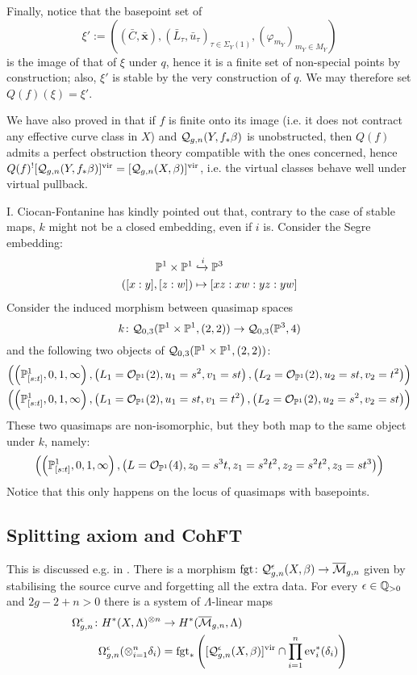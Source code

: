 Finally, notice that the basepoint set of \[\xi':=\left((\bar C,\bar{\mathbf x}),(\bar L_\tau,\bar u_\tau)_{\tau\in\Sigma_Y(1)},(\varphi_{m_Y})_{m_Y\in M_Y}\right)\] is the image of that of $\xi$ under $q$, hence it is a finite set of non-special points by construction; also, $\xi'$ is stable by the very construction of $q$. We may therefore set $Q(f)(\xi)=\xi'$.

We have also proved in \cite[Lemma B.5]{BN} that if $f$ is finite onto its image (i.e. it does not contract any effective curve class in $X$) and $\mathcal{Q}_{g,n}(Y,f_*\beta)$ is unobstructed, then $Q(f)$ admits a perfect obstruction theory compatible with the ones concerned, hence $Q(f)^![\mathcal{Q}_{g,n}(Y,f_*\beta)]^{\mathrm{vir}}=[\mathcal{Q}_{g,n}(X,\beta)]^{\mathrm{vir}}$, i.e. the virtual classes behave well under virtual pullback.

\begin{rmk}
I. Ciocan-Fontanine has kindly pointed out that, contrary to the case of stable maps, $k$ might not be a closed embedding, even if $i$ is. Consider the Segre embedding:
\begin{align*}
\mathbb P^1\times\mathbb P^1 & \xhookrightarrow{i} \mathbb P^3\\ 
([x:y],[z:w]) & \mapsto [xz:xw:yz:yw]\end{align*}
Consider the induced morphism between quasimap spaces
\begin{equation*} k\colon \mathcal{Q}_{0,3}(\mathbb P^1\times\mathbb P^1,(2,2))\rightarrow\mathcal{Q}_{0,3}(\mathbb P^3,4) \end{equation*}
and the following two objects of $\mathcal{Q}_{0,3}(\mathbb P^1 \times \mathbb P^1,(2,2))$:
\begin{align*}
  \left(\left(\mathbb P^1_{[s:t]},0,1,\infty\right),\left(L_1=\mathcal{O}_{\mathbb P^1}(2),u_1=s^2 ,v_1=st\right),\left(L_2=\mathcal{O}_{\mathbb P^1}(2), u_2=st,v_2=t^2\right)\right)\\
  \left(\left(\mathbb P^1_{[s:t]},0,1,\infty\right),\left(L_1=\mathcal{O}_{\mathbb P^1}(2),u_1=st ,v_1=t^2 \right),\left(L_2=\mathcal{O}_{\mathbb P^1}(2), u_2=s^2,v_2=st\right)\right)
\end{align*}
These two quasimaps are non-isomorphic, but they both map to the same object under $k$, namely:
 \[
   \left(\left(\mathbb P^1_{[s:t]},0,1,\infty\right),\left(L=\mathcal{O}_{\mathbb P^1}(4),z_0=s^3t,z_1=s^2t^2,z_2=s^2t^2,z_3=st^3\right)\right)
 \]
Notice that this only happens on the locus of quasimaps with basepoints.
 \end{rmk}
\subsection{Splitting axiom and CohFT}\label{sec:cohFT}
This is discussed e.g. in \cite[\S 2.3.3]{CF-K-higher-genus}. There is a morphism $\operatorname{fgt}\colon \mathcal{Q}^{\epsilon}_{g,n}(X,\beta)\rightarrow \overline{\mathcal{M}}_{g,n}$ given by stabilising the source curve and forgetting all the extra data. For every $\epsilon\in\mathbb{Q}_{>0}$ and $2g-2+n>0$ there is a system of $\Lambda$-linear maps
\begin{align*}\Omega^\epsilon_{g,n}\colon H^*(X,\Lambda)^{\otimes n} & \rightarrow H^*(\overline{\mathcal{M}}_{g,n},\Lambda) \\
\Omega^\epsilon_{g,n}(\otimes_{i=1}^n\delta_i) & = \operatorname{fgt}_*\left([\mathcal{Q}^{\epsilon}_{g,n}(X,\beta)]^{\mathrm{vir}}\cap\prod_{i=1}^n\operatorname{ev}_i^*(\delta_i)\right) \end{align*}

